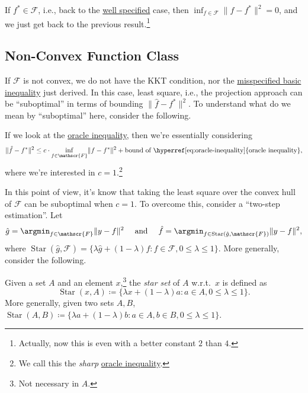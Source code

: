 \begin{remark}
	If \(f^{\ast} \in \mathscr{F} \), i.e., back to the \hyperref[def:well-specified]{well specified} case, then \(\inf _{f\in \mathscr{F} } \lVert f - f^{\ast} \rVert ^2 = 0\), and we just get back to the previous result.\footnote{Actually, now this is even with a better constant \(2\) than \(4\).}
\end{remark}

\subsection{Non-Convex Function Class}
If \(\mathscr{F} \) is not convex, we do not have the KKT condition, nor the \hyperref[eq:misspecified-convex-basic-inequality]{misspecified basic inequality} just derived. In this case, least square, i.e., the projection approach can be ``suboptimal'' in terms of bounding \(\lVert \hat{f} - f^{\ast} \rVert ^2\). To understand what do we mean by ``suboptimal'' here, consider the following.

\begin{intuition}
	If we look at the \hyperref[eq:oracle-inequality]{oracle inequality}, then we're essentially considering
	\[
		\lVert \hat{f} - f^{\ast}  \rVert ^2 \leq c \cdot \inf _{f\in \mathscr{F} } \lVert f - f^{\ast}  \rVert ^2 + \text{bound of \hyperref[eq:oracle-inequality]{oracle inequality}},
	\]
	where we're interested in \(c = 1\).\footnote{We call this the \emph{sharp} \hyperref[eq:oracle-inequality]{oracle inequality}.}
\end{intuition}

In this point of view, it's know that taking the least square over the convex hull of \(\mathscr{F} \) can be suboptimal when \(c = 1\). To overcome this, consider a ``two-step estimation''. Let
\[
	\hat{g} = \argmin_{f\in \mathscr{F} } \lVert y - f \rVert ^2
	\quad\text{ and }\quad
	\hat{f} = \argmin_{f\in \mathop{\mathrm{Star}}(\hat{g} , \mathscr{F} ) } \lVert y - f \rVert ^2,
\]
where \(\mathop{\mathrm{Star}}(\hat{g} , \mathscr{F} ) = \{ \lambda \hat{g} + (1 - \lambda ) f \colon f\in \mathscr{F} , 0 \leq \lambda \leq 1 \} \). More generally, consider the following.

\begin{definition}\label{def:star-set}
	Given a set \(A\) and an element \(x\),\footnote{Not necessary in \(A\).} the \emph{star set} of \(A\) w.r.t.\ \(x\) is defined as
	\[
		\mathop{\mathrm{Star}}(x, A) \coloneqq \{ \lambda x + (1 - \lambda ) a \colon a\in A , 0 \leq \lambda \leq 1 \}.
	\]
	More generally, given two sets \(A, B\), \(\mathop{\mathrm{Star}}(A, B) \coloneqq \{ \lambda a + (1 - \lambda ) b \colon a\in A , b\in B, 0 \leq \lambda \leq 1 \}\).
\end{definition}

